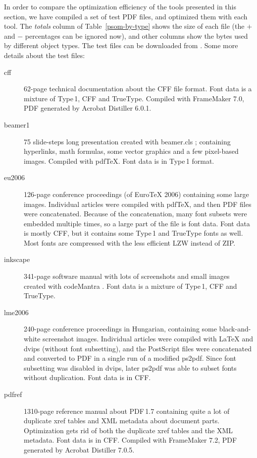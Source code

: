 \documentclass{ltugproc}
\def\cmd{\textsf}
\def\pkg{\textsf}
\begin{document}
In order to compare the optimization efficiency of the tools presented in
this section, we have compiled a set of test PDF files, and optimized them
with each tool. The \emph{totals} column of Table~\ref{psom-by-type} shows
the size of each file (the $+$ and $-$ percentages can be ignored now), and
other columns show the bytes used by different object types. The test files
can be downloaded from \cite{example-pdfs}. Some more
details about the test files:

\begin{description}

\item[cff] 62-page technical documentation about the CFF file format. Font
data is a mixture of Type\,1, CFF and TrueType. Compiled with FrameMaker
7.0, PDF generated by Acrobat Distiller 6.0.1. 

\item[beamer1] 75 slide-steps long presentation created with
\pkg{beamer.cls} \cite{beamer}; containing hyperlinks, math formulas, some
vector graphics and a few pixel-based images. Compiled with pdf\TeX{}.
Font data is in Type\,1 format.

\item[eu2006] 126-page conference proceedings (of Euro\TeX{} 2006)
containing some large images. Individual articles were compiled with
pdf\TeX{}, and then PDF files were concatenated. Because of the
concatenation, many font subsets were embedded multiple times, so a large
part of the file is font data. Font data is mostly CFF, but it contains some
Type\,1 and TrueType fonts as well. Most fonts are compressed with the
less efficient LZW instead of ZIP.

\item[inkscape] 341-page software manual with lots of screenshots and small
images created with codeMantra \cite{codemantra}. Font data is a mixture of
Type\,1, CFF and TrueType.

\item[lme2006] 240-page conference proceedings in Hungarian, containing some
black-and-white screenshot images. Individual articles were compiled with
\LaTeX{} and \cmd{dvips} (without font subsetting), and the PostScript files
were concatenated and converted to PDF in a single run of a modified
\cmd{ps2pdf}. Since font subsetting was disabled in \cmd{dvips}, later
\cmd{ps2pdf} was able to subset fonts without duplication. Font data is in
CFF.

\item[pdfref] 1310-page reference manual about PDF\,1.7 containing quite a
lot of duplicate xref tables and XML metadata about document parts.
Optimization gets rid of both the duplicate xref tables and the XML
metadata. Font data is in CFF. Compiled with FrameMaker 7.2, PDF generated
by Acrobat Distiller 7.0.5.


\end{description}
\end{document}
